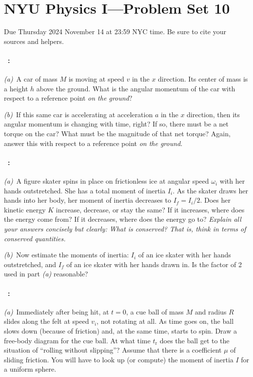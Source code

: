 \documentclass[12pt]{article}
\begin{document}
\section*{NYU Physics I---Problem Set 10}

Due Thursday 2024 November 14 at 23:59 NYC time. Be sure to cite your sources and helpers.

\paragraph{\problemname~\theproblem:}%
\textsl{(a)}~A car of mass $M$ is moving at speed $v$ in the $x$
direction. Its center of mass is a height $h$ above the ground.  What
is the angular momentum of the car with respect to a reference point
\emph{on the ground}?

\textsl{(b)}~If this same car is accelerating at acceleration $a$
in the $x$ direction, then its angular momentum is changing with time,
right? If so, there must be a net torque on the car? What must be
the magnitude of that net torque? Again, answer this with respect
to a reference point \emph{on the ground}.

\paragraph{\problemname~\theproblem:}%
\textsl{(a)}~A figure skater spins in place on frictionless ice at
angular speed $\omega_i$ with her hands outstretched.  She has a total
moment of inertia $I_i$.  As the skater draws her hands into her body,
her moment of inertia decreases to $I_f=I_i/2$.  Does her kinetic
energy $K$ increase, decrease, or stay the same?  If it increases,
where does the energy come from?  If it decreases, where does the
energy go to?  \emph{Explain all your answers concisely but clearly:
What is conserved? That is, think in terms of conserved quantities.}

\textsl{(b)}~Now estimate the moments of inertia: $I_i$ of an ice
skater with her hands outstretched, and $I_f$ of an ice skater with
her hands drawn in.  Is the factor of 2 used in part \textsl{(a)}
reasonable?

\paragraph{\problemname~\theproblem:}\label{cue}%
\textsl{(a)}~Immediately after being hit, at $t=0$, a cue ball of mass
$M$ and radius $R$ slides along the felt at speed $v_i$, not rotating
at all.  As time goes on, the ball slows down (because of friction)
and, at the same time, starts to spin.  Draw a free-body diagram for
the cue ball.  At what time $t_\mathrm{r}$ does the ball get to the
situation of ``rolling without slipping''?  Assume that there is a
coefficient $\mu$ of sliding friction. You will have to look up (or
compute) the moment of inertia $I$ for a uniform sphere.
\end{document}
